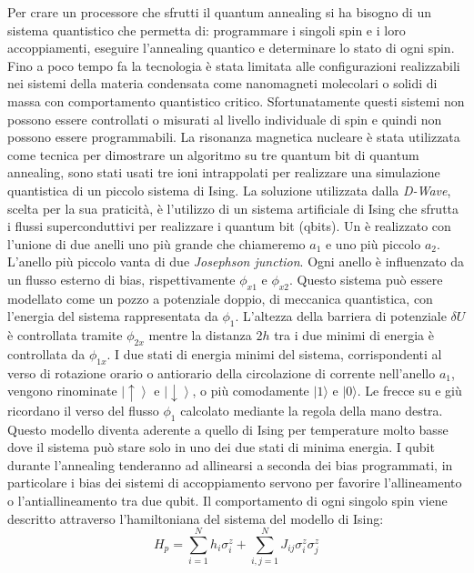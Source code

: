 \cite{QAS}Per crare un processore che sfrutti il quantum annealing si ha bisogno di un sistema quantistico che permetta di: programmare  i singoli spin e i loro accoppiamenti, eseguire l'annealing quantico e determinare lo stato di ogni spin.
Fino a poco tempo fa la tecnologia è stata limitata alle configurazioni realizzabili nei sistemi della materia condensata come nanomagneti molecolari o solidi di massa con comportamento quantistico critico. Sfortunatamente questi sistemi non possono essere controllati o misurati al livello individuale di spin e quindi non possono essere programmabili. La risonanza magnetica nucleare è stata utilizzata come tecnica per dimostrare un algoritmo su tre quantum bit di quantum annealing, sono stati usati tre ioni intrappolati per realizzare una simulazione quantistica di un piccolo sistema di Ising.
La soluzione utilizzata dalla \textit{D-Wave}, scelta per la sua praticità, è l'utilizzo di un sistema artificiale di Ising che sfrutta i flussi superconduttivi per realizzare i quantum bit (qbits). Un  è realizzato con l'unione di due anelli uno più grande che chiameremo $a_1$ e uno più piccolo $a_2$. L'anello più piccolo vanta di due \textit{Josephson junction}. Ogni anello è influenzato da un flusso esterno di bias, rispettivamente $\phi_{x1}$ e $\phi_{x2}$. Questo sistema può essere modellato come un pozzo a potenziale doppio, di meccanica quantistica, con l'energia del sistema rappresentata da $\phi_1$. L'altezza della barriera di potenziale $\delta U$ è controllata tramite $\phi_{2x}$ mentre la distanza $2h$ tra i due minimi di energia è controllata da $\phi_{1x}$.
I due stati di energia minimi del sistema, corrispondenti al verso di rotazione orario o antiorario della circolazione di corrente nell'anello $a_1$, vengono rinominate $\left|\uparrow \right\rangle$ e $\left|\downarrow \right\rangle$, o più comodamente $|1 \rangle$ e $|0 \rangle$. Le frecce su e giù ricordano il verso del flusso $\phi_1$ calcolato mediante la regola della mano destra. Questo modello diventa aderente a quello di Ising per temperature molto basse dove il sistema può stare solo in uno dei due stati di minima energia. I qubit durante l'annealing tenderanno ad allinearsi a seconda dei bias programmati, in particolare i bias dei sistemi di accoppiamento servono per favorire l'allineamento o l'antiallineamento tra due qubit. Il comportamento di ogni singolo spin viene descritto attraverso l'hamiltoniana del sistema del modello di Ising:
$$H_p = \sum_{i=1}^N h_i \sigma_i^z + \sum_{i,j=1}^N J_{ij} \sigma_i^z \sigma_j^z$$
